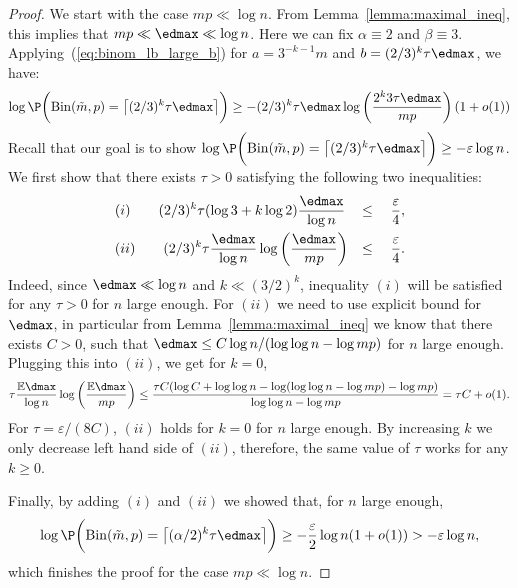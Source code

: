 \begin{proof}
    \noindent
    We start with the case \(mp \ll \log n\). From Lemma~\ref{lemma:maximal_ineq}, this implies that \(mp \ll \edmax \ll \log n\). Here we can fix \(\alpha \equiv 2\) and \(\beta \equiv 3\). Applying~(\ref{eq:binom_lb_large_b}) for \(a = 3^{-k-1}m\) and \(b = (2/3)^k \tau \edmax\), we have:
    \begin{equation}
        \log \P\biggl(\mathrm{Bin}(\tilde m, p) = \bigl\lceil (2/3)^k \tau \edmax\bigr\rceil \biggr) \geq - (2/3)^k \tau \edmax \log \left(\frac{2^k 3 \tau \edmax}{ mp}\right) (1 + o(1))
    \end{equation}
    Recall that our goal is to show \(\log \P\biggl(\mathrm{Bin}(\tilde m, p) = \bigl\lceil (2/3)^k \tau \edmax\bigr\rceil \biggr) \geq -\varepsilon \log n\). We first show that there exists \(\tau > 0\) satisfying the following two inequalities:
    \begin{equation}
    \begin{aligned}
        &(i) \qquad (2/3)^k \tau (\log 3 + k \log 2 ) \frac{\edmax}{\log n} &\leq \quad \frac{\varepsilon}{4}, \\
        &(ii) \qquad (2/3)^k \tau \frac{\edmax}{\log n} \log \left(\frac{\edmax}{mp}\right) &\leq \quad \frac{\varepsilon}{4}.
    \end{aligned}
    \end{equation}
    Indeed, since \(\edmax \ll \log n\) and \(k \ll (3/2)^k\), inequality \((i)\) will be satisfied for any \(\tau > 0\) for \(n\) large enough. For \((ii)\) we need to use explicit bound for \(\edmax\), in particular from Lemma~\ref{lemma:maximal_ineq} we know that there exists \(C > 0\), such that \(\edmax \leq C \log n / (\log \log n - \log mp)\) for \(n\) large enough. Plugging this into \((ii)\), we get for \(k = 0\),
    \begin{equation}
        \tau \frac{\mathbb{E}\dmax}{\log n}\log\left(\frac{\mathbb{E}\dmax}{mp}\right) \leq \frac{\tau C (\log C + \log \log n - \log (\log \log n - \log mp) - \log mp)}{\log \log n - \log mp} = \tau C + o(1).
    \end{equation}
    For \(\tau = \varepsilon / (8C)\), \((ii)\) holds for \(k = 0\) for \(n\) large enough. By increasing \(k\) we only decrease left hand side of \((ii)\), therefore, the same value of \(\tau\) works for any \(k \geq 0\). 

    \noindent
    Finally, by adding \((i)\) and \((ii)\) we showed that, for \(n\) large enough, 
    \begin{equation*}
    \log \P\biggl(\mathrm{Bin}(\tilde m, p) = \bigl\lceil (\alpha/2)^k \tau \edmax\bigr\rceil \biggr) \geq - \frac{\varepsilon}{2}\log n (1 + o(1)) > -\varepsilon \log n,
    \end{equation*}
    which finishes the proof for the case \(mp \ll \log n\).


\end{proof}
